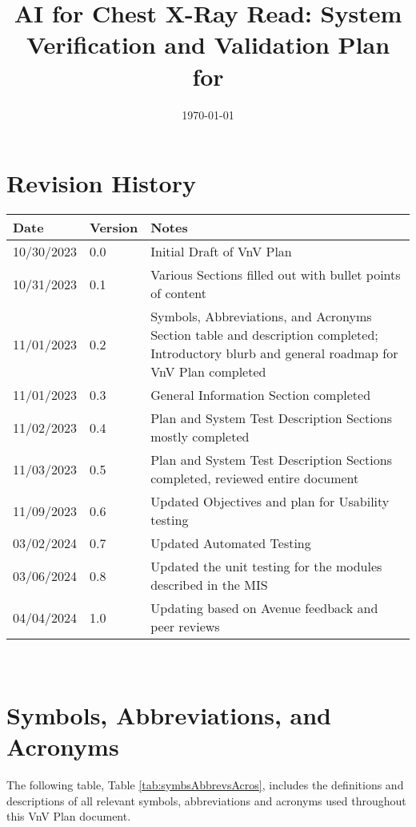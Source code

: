 \documentclass[12pt, titlepage]{article}
\begin{document}
\title{AI for Chest X-Ray Read: System Verification and Validation Plan for \progname}
\author{\authname}
\date{\today}
    
\maketitle


\section*{Revision History}

\begin{tabularx}{\textwidth}{p{3cm}p{2cm}X}
    \toprule {\bf Date} & {\bf Version} & {\bf Notes}\\
    \midrule
    10/30/2023 & 0.0 & Initial Draft of VnV Plan\\
    10/31/2023 & 0.1 & Various Sections filled out with bullet points of content\\
    11/01/2023 & 0.2 & Symbols, Abbreviations, and Acronyms Section table and description completed; Introductory blurb and general roadmap for VnV Plan completed\\
    11/01/2023 & 0.3 & General Information Section completed\\
    11/02/2023 & 0.4 & Plan and System Test Description Sections mostly completed\\
    11/03/2023 & 0.5 & Plan and System Test Description Sections completed, reviewed entire document\\
    11/09/2023 & 0.6 & Updated Objectives and plan for Usability testing\\
    03/02/2024 & 0.7 & Updated Automated Testing \\
    03/06/2024 & 0.8 & Updated the unit testing for the modules described in the MIS \\
    04/04/2024 & 1.0 & Updating based on Avenue feedback and peer reviews\\
    \bottomrule
\end{tabularx}

~\\

\newpage

\tableofcontents

\listoftables

\listoffigures

\newpage

\section{Symbols, Abbreviations, and Acronyms}
The following table, Table \ref{tab:symbsAbbrevsAcros}, includes the definitions and descriptions of all relevant symbols, abbreviations and acronyms used throughout this VnV Plan document.
\end{document}
